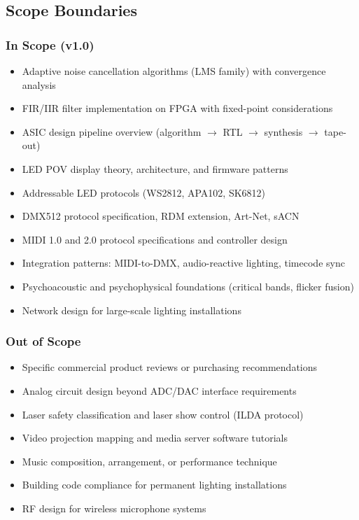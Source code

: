 \documentclass[11pt,letterpaper]{article}
\begin{document}
\subsection{Scope Boundaries}

\subsubsection*{In Scope (v1.0)}

\begin{itemize}[leftmargin=2em]
\item Adaptive noise cancellation algorithms (LMS family) with convergence analysis
\item FIR/IIR filter implementation on FPGA with fixed-point considerations
\item ASIC design pipeline overview (algorithm $\to$ RTL $\to$ synthesis $\to$ tape-out)
\item LED POV display theory, architecture, and firmware patterns
\item Addressable LED protocols (WS2812, APA102, SK6812)
\item DMX512 protocol specification, RDM extension, Art-Net, sACN
\item MIDI 1.0 and 2.0 protocol specifications and controller design
\item Integration patterns: MIDI-to-DMX, audio-reactive lighting, timecode sync
\item Psychoacoustic and psychophysical foundations (critical bands, flicker fusion)
\item Network design for large-scale lighting installations
\end{itemize}

\subsubsection*{Out of Scope}

\begin{itemize}[leftmargin=2em]
\item Specific commercial product reviews or purchasing recommendations
\item Analog circuit design beyond ADC/DAC interface requirements
\item Laser safety classification and laser show control (ILDA protocol)
\item Video projection mapping and media server software tutorials
\item Music composition, arrangement, or performance technique
\item Building code compliance for permanent lighting installations
\item RF design for wireless microphone systems
\end{itemize}
\end{document}

